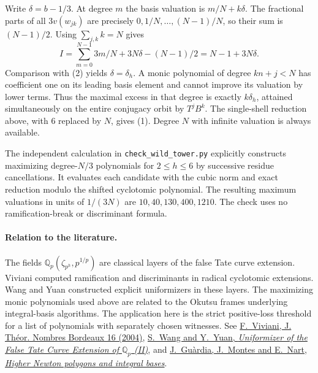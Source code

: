 \documentclass[11pt]{article}
\begin{document}
Write $\delta=b-1/3$. At degree $m$ the basis valuation is $m/N+k\delta$.
The fractional parts of all $3v(w_{jk})$ are precisely
$0,1/N,\ldots,(N-1)/N$, so their sum is $(N-1)/2$.
Using $\sum_{j,k} k=N$ gives
\[
 I=\sum_{m=0}^{N-1}3m/N+3N\delta-(N-1)/2
   =N-1+3N\delta.
\]
Comparison with (2) yields $\delta=\delta_h$.
A monic polynomial of degree $kn+j<N$ has coefficient one on its leading
basis element and cannot improve its valuation by lower terms.
Thus the maximal excess in that degree is exactly $k\delta_h$,
attained simultaneously on the entire conjugacy orbit by $T^jB^k$.
The single-shell reduction above, with $6$ replaced by $N$, gives (1).
Degree $N$ with infinite valuation is always available.

The independent calculation in \texttt{check\_wild\_tower.py} explicitly
constructs maximizing degree-$N/3$ polynomials for $2\le h\le6$ by
successive residue cancellations. It evaluates each candidate with
the cubic norm and exact reduction modulo the shifted cyclotomic
polynomial. The resulting maximum valuations in units of $1/(3N)$
are $10,40,130,400,1210$. The check uses no ramification-break or
discriminant formula.

\paragraph{Relation to the literature.}
The fields $\mathbb Q_p(\zeta_{p^h},p^{1/p})$ are classical layers of the
false Tate curve extension. Viviani computed ramification and discriminants
in radical cyclotomic extensions. Wang and Yuan constructed explicit
uniformizers in these layers. The maximizing monic polynomials used above
are related to the Okutsu frames underlying integral-basis algorithms.
The application here is the strict positive-loss threshold for a list of
polynomials with separately chosen witnesses.
See \href{https://doi.org/10.5802/jtnb.470}{F.~Viviani, J. Th\'eor.
Nombres Bordeaux 16 (2004)},
\href{https://arxiv.org/abs/2301.09135}{S.~Wang and Y.~Yuan,
\emph{Uniformizer of the False Tate Curve Extension of $\mathbb Q_p$ (II)}},
and \href{https://doi.org/10.1016/j.jnt.2014.07.027}{J.~Guàrdia,
J.~Montes and E.~Nart, \emph{Higher Newton polygons and integral bases}}.
\end{document}
